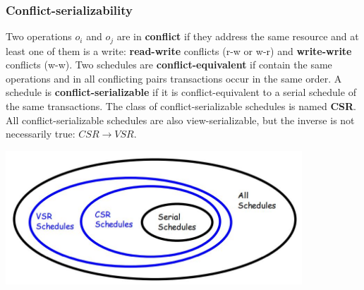 \subsubsection{Conflict-serializability}
Two operations $o_i$ and $o_j$ are in \textbf{conflict} if they address the same resource and at least one of them is a write: \textbf{read-write} conflicts (r-w or w-r) and \textbf{write-write} conflicts (w-w).\newline
\newline
Two schedules are \textbf{conflict-equivalent} if contain the same operations and in all conflicting pairs transactions occur in the same order.\newline
\newline
A schedule is \textbf{conflict-serializable} if it is conflict-equivalent to a serial schedule of the same transactions.\newline
The class of conflict-serializable schedules is named \textbf{CSR}.
\newline
\newline
All conflict-serializable schedules are also view-serializable, but the inverse is not necessarily true: $CSR \rightarrow VSR$.
\begin{center}
    \includegraphics[height=5cm]{../arguments/CSRandVSR.JPG}
\end{center}
